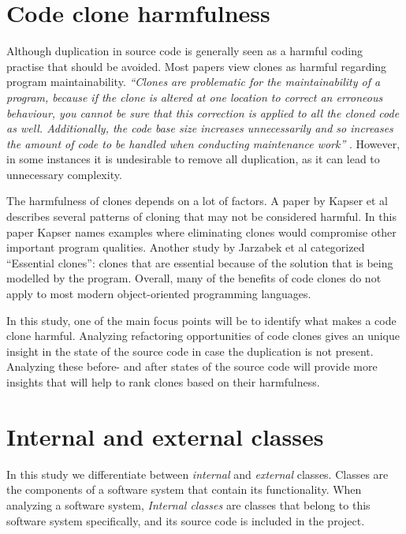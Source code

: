 \section{Code clone harmfulness}
Although duplication in source code is generally seen as a harmful coding practise that should be avoided. Most papers view clones as harmful regarding program maintainability. \textit{``Clones are problematic for the maintainability of a program, because if the clone is altered at one location to correct an erroneous behaviour, you cannot be sure that this correction is applied to all the cloned code as well. Additionally, the code base size increases unnecessarily and so increases the amount of code to be handled when conducting maintenance work''} \cite{ostberg2014automatically}. However, in some instances it is undesirable to remove all duplication, as it can lead to unnecessary complexity.

The harmfulness of clones depends on a lot of factors. A paper by Kapser et al \cite{kapser2006cloning} describes several patterns of cloning that may not be considered harmful. In this paper Kapser names examples where eliminating clones would compromise other important program qualities. Another study by Jarzabek et al \cite{jarzabek2010clones} categorized ``Essential clones'': clones that are essential because of the solution that is being modelled by the program. Overall, many of the benefits of code clones do not apply to most modern object-oriented programming languages.

In this study, one of the main focus points will be to identify what makes a code clone harmful. Analyzing refactoring opportunities of code clones gives an unique insight in the state of the source code in case the duplication is not present. Analyzing these before- and after states of the source code will provide more insights that will help to rank clones based on their harmfulness.

\section{Internal and external classes}
In this study we differentiate between \textit{internal} and \textit{external} classes. Classes are the components of a software system that contain its functionality. When analyzing a software system, \textit{Internal classes} are classes that belong to this software system specifically, and its source code is included in the project.

